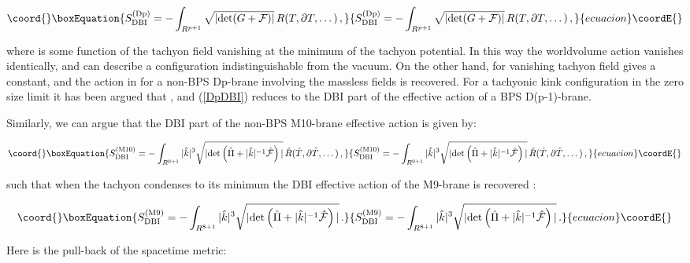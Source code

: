 \documentclass[12pt,a4paper]{article}
\begin{document}
\begin{equation}\coord{}\boxEquation{
\label{DpDBI}
S^{({\rm Dp})}_{{\rm DBI}}=-\int_{R^{p+1}} \sqrt{|{\rm det}(G+{\cal F})|}
\,R(T,\partial T,\dots)\, ,
}{
S^{({\rm Dp})}_{{\rm DBI}}=-\int_{R^{p+1}} \sqrt{|{\rm det}(G+{\cal F})|}
\,R(T,\partial T,\dots)\, ,
}{ecuacion}\coordE{}\end{equation}

\noindent where \coordHE{} is some function of the tachyon field vanishing
at the minimum of the tachyon potential. In this way
the worldvolume action vanishes
identically, and can describe a configuration indistinguishable from
the vacuum. On the other hand, for vanishing tachyon field \coordHE{} gives
a constant, and the action in \cite{Sen2} for a non-BPS Dp-brane 
involving the massless fields is recovered. 
For a tachyonic kink configuration in the zero size limit
it has been argued that
\coordHE{} \cite{Kluson}, and (\ref{DpDBI})
reduces to the DBI part of the effective action of a BPS 
D(p-1)-brane.

Similarly, we can argue that the DBI part of the non-BPS
M10-brane effective action is given by: 

\begin{equation}\coord{}\boxEquation{
\label{M10DBI}
S^{({\rm M10})}_{{\rm DBI}} =-\int_{R^{9+1}} |{\hat k}|^3 
\sqrt{|{\rm det} \left( {\hat \Pi}+ |{\hat k}|^{-1}  
{\hat {\cal F}} \right)|}
\,{\hat R}({\hat T},\partial {\hat T},\dots)\, ,
}{
S^{({\rm M10})}_{{\rm DBI}} =-\int_{R^{9+1}} |{\hat k}|^3 
\sqrt{|{\rm det} \left( {\hat \Pi}+ |{\hat k}|^{-1}  
{\hat {\cal F}} \right)|}
\,{\hat R}({\hat T},\partial {\hat T},\dots)\, ,
}{ecuacion}\coordE{}\end{equation}

\noindent such that when the tachyon condenses to its minimum
the DBI effective action
of the M9-brane is recovered \cite{BvdS, EL1}:

\begin{equation}\coord{}\boxEquation{
\label{M9DBI}
S^{({\rm M9})}_{{\rm DBI}}=-\int_{R^{8+1}}|{\hat k}|^3 
\sqrt{|{\rm det} \left( {\hat \Pi}+ |{\hat k}|^{-1}
{\hat {\cal F}} \right)|}\, .
}{
S^{({\rm M9})}_{{\rm DBI}}=-\int_{R^{8+1}}|{\hat k}|^3 
\sqrt{|{\rm det} \left( {\hat \Pi}+ |{\hat k}|^{-1}
{\hat {\cal F}} \right)|}\, .
}{ecuacion}\coordE{}\end{equation}

\noindent Here \myHighlight{${\hat \Pi}$}\coordHE{} is the pull-back of the spacetime
metric:
\end{document}

